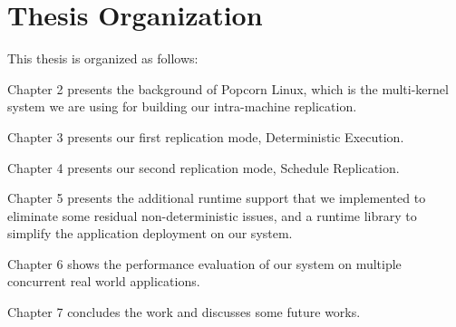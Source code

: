 \section{Thesis Organization}
This thesis is organized as follows:

Chapter 2 presents the background of Popcorn Linux, which is the multi-kernel system we are using for building our intra-machine replication.

Chapter 3 presents our first replication mode, Deterministic Execution. 

Chapter 4 presents our second replication mode, Schedule Replication.

Chapter 5 presents the additional runtime support that we implemented to eliminate some residual non-deterministic issues, and a runtime library to simplify the application deployment on our system.

Chapter 6 shows the performance evaluation of our system on multiple concurrent real world applications.

Chapter 7 concludes the work and discusses some future works.